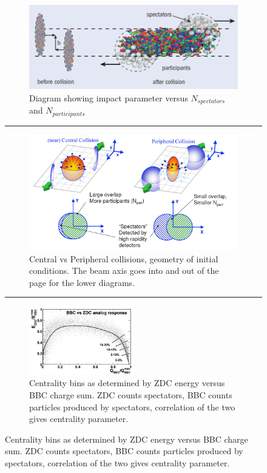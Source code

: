 \begin{figure}[htbp!]
  \centering
    \begin{subfigure}[p]{0.7\textwidth}
    \includegraphics[width=1\textwidth]{Figures/spectatorsvsparticipants.jpg}
    \caption[Diagram showing impact parameter versus $N_{spectators}$ and $N_{participants}$]{Diagram showing impact parameter versus $N_{spectators}$ and $N_{participants}$\citep{cernhifireball}}
    \label{fig:cernfireball}
    \end{subfigure} 
    \rule{35em}{0.5pt}
    \begin{subfigure}[p]{0.7\textwidth}
    \includegraphics[width=1\textwidth]{Figures/centralvsperipheral.jpg}
	\caption[Central vs Peripheral collisions, geometry of initial conditions]{Central vs Peripheral collisions, geometry of initial conditions. The beam axis goes into and out of the page for the lower diagrams.}
\label{fig:centvsperiph}
    \end{subfigure}
    \rule{35em}{0.5pt}
\begin{subfigure}[p]{1\textwidth}
  \centering
    \includegraphics[width=0.5\textwidth]{prevplots/bbczdcanaresponse.JPG}

  \caption[Centrality bins as determined by ZDC energy versus BBC charge sum]{Centrality bins as determined by ZDC energy versus BBC charge sum\citep{Ghosh2001}. ZDC counts spectators, BBC counts particles produced by spectators, correlation of the two gives centrality parameter.}
  \label{fig:zdcvsbbc}
\end{subfigure}
\end{figure}

